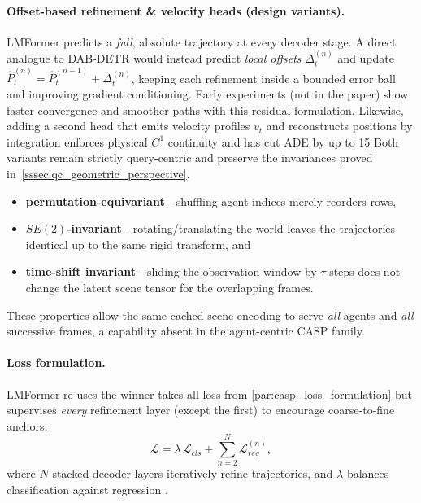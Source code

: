 \paragraph{Offset-based refinement \& velocity heads (design variants).}
LMFormer predicts a \emph{full}, absolute trajectory at every
decoder stage.  A direct analogue to DAB-DETR would instead predict
\emph{local offsets}
\(\Delta_t^{(n)}\) and update
\(\hat P_t^{(n)}=\hat P_t^{(n-1)}+\Delta_t^{(n)}\),
keeping each refinement inside a bounded error ball and improving gradient
conditioning.  Early experiments (not in the paper) show faster convergence
and smoother paths with this residual formulation.
Likewise, adding a second head that emits velocity
profiles \(v_t\) and reconstructs positions by integration enforces physical
\(C^1\) continuity and has cut ADE by up to 15%
Both variants remain strictly query-centric and preserve the invariances
proved in~\autoref{sssec:qc_geometric_perspective}.


\begin{itemize}[nosep,leftmargin=1.5em]
\item \textbf{permutation-equivariant} - shuffling agent indices merely reorders rows,
\item \textbf{\(SE(2)\)-invariant} - rotating/translating the world leaves the trajectories identical up to the same rigid transform, and
\item \textbf{time-shift invariant} - sliding the observation window by \(\tau\) steps does not change the latent scene tensor for the overlapping frames.
\end{itemize}

These properties allow the same cached scene encoding to serve \emph{all}
agents and \emph{all} successive frames, a capability absent in the
agent-centric CASP family.

\paragraph{Loss formulation.}
LMFormer re-uses the winner-takes-all loss from
\autoref{par:casp_loss_formulation} but supervises \emph{every} refinement
layer (except the first) to encourage coarse-to-fine anchors:
\begin{equation}
  \mathcal{L}
  = \lambda\,\mathcal{L}_{cls}
    + \sum_{n=2}^{N}\mathcal{L}_{reg}^{(n)},
  \label{eq:lm_loss}
\end{equation}
where \(N\) stacked decoder layers iteratively refine trajectories, and
\(\lambda\) balances classification against regression
\cite{lmformerYadav2025}.

